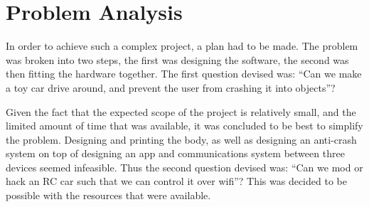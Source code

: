 \section{Problem Analysis}
\par
In order to achieve such a complex project, a plan had to be made. The problem was broken into two steps, the first was designing the software, the second was then fitting the hardware together.
The first question devised was: ``Can we make a toy car drive around, and prevent the user from crashing it into objects''?


Given the fact that the expected scope of the project is relatively small, and the limited amount of time that was available, it was concluded to be best to simplify the problem. Designing and printing the body, as well as designing an anti-crash system on top of designing an app and communications system between three devices seemed infeasible. Thus the second question devised was: ``Can we mod or hack an RC car such that we can control it over wifi''? This was decided to be possible with the resources that were available.
